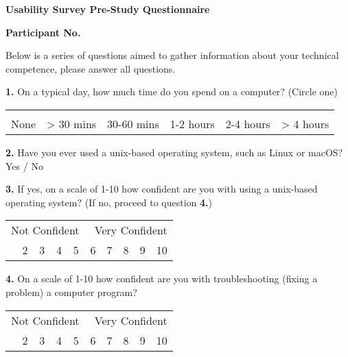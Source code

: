 \begin{center}
	\textbf{Usability Survey Pre-Study Questionnaire}\par
	\textbf{Participant No.}\par
\end{center}

Below is a series of questions aimed to gather information about your technical competence, please answer all questions.

\vspace{0.5cm}

\textbf{1.} On a typical day, how much time do you spend on a computer? (Circle one)
\begin{table}[h]
	\centering
	\begin{tabularx}{\textwidth}{XXXXXX}
		\multicolumn{6}{l}{} \\
		\centering
		None & > 30 mins & 30-60 mins & 1-2 hours & 2-4 hours & > 4 hours \\
	\end{tabularx}
\end{table}

\textbf{2.} Have you ever used a unix-based operating system, such as Linux or macOS? \tab Yes / No

\vspace{0.5cm}

\textbf{3.} If yes, on a scale of 1-10 how confident are you with using a unix-based operating system? (If no, proceed to question \textbf{4.})

\begin{table}[h]
	\centering
	\begin{tabularx}{\textwidth}{XXXXXXXXXX}
		\multicolumn{5}{l}{Not Confident} & \multicolumn{5}{r}{Very Confident} \\
		\centering
		1    & 2    & 3    & 4    & 5    & 6    & 7    & 8    & 9    & 10
	\end{tabularx}
\end{table}

\textbf{4.} On a scale of 1-10 how confident are you with troubleshooting (fixing a problem) a computer program?

\begin{table}[h]
	\centering
	\begin{tabularx}{\textwidth}{XXXXXXXXXX}
		\multicolumn{5}{l}{Not Confident} & \multicolumn{5}{r}{Very Confident} \\
		\centering
		1    & 2    & 3    & 4    & 5    & 6    & 7    & 8    & 9    & 10
	\end{tabularx}
\end{table}

